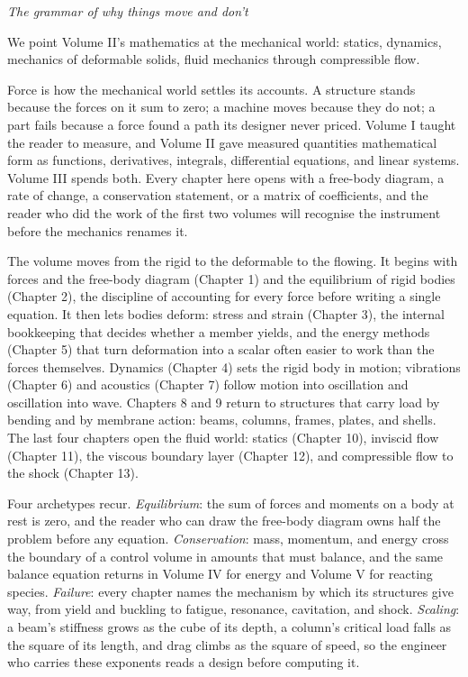 
\vspace*{1.5cm}
\begin{center}
\itshape\large
The grammar of why things move and don't
\end{center}
\vspace{0.5cm}

\noindent
We point Volume II's mathematics at the mechanical world: statics, dynamics, mechanics of deformable solids, fluid mechanics through compressible flow.

Force is how the mechanical world settles its accounts. A structure
stands because the forces on it sum to zero; a machine moves because
they do not; a part fails because a force found a path its designer
never priced. Volume I taught the reader to measure, and Volume II gave
measured quantities mathematical form as functions, derivatives,
integrals, differential equations, and linear systems. Volume III spends
both. Every chapter here opens with a free-body diagram, a rate of
change, a conservation statement, or a matrix of coefficients, and the
reader who did the work of the first two volumes will recognise the
instrument before the mechanics renames it.

The volume moves from the rigid to the deformable to the flowing. It
begins with forces and the free-body diagram (Chapter 1) and the
equilibrium of rigid bodies (Chapter 2), the discipline of accounting
for every force before writing a single equation. It then lets bodies
deform: stress and strain (Chapter 3), the internal bookkeeping that
decides whether a member yields, and the energy methods (Chapter 5) that
turn deformation into a scalar often easier to work than the forces
themselves. Dynamics (Chapter 4) sets the rigid body in motion;
vibrations (Chapter 6) and acoustics (Chapter 7) follow motion into
oscillation and oscillation into wave. Chapters 8 and 9 return to
structures that carry load by bending and by membrane action: beams,
columns, frames, plates, and shells. The last four chapters open the
fluid world: statics (Chapter 10), inviscid flow (Chapter 11), the
viscous boundary layer (Chapter 12), and compressible flow to the shock
(Chapter 13).

Four archetypes recur. \emph{Equilibrium}: the sum of forces and moments
on a body at rest is zero, and the reader who can draw the free-body
diagram owns half the problem before any equation. \emph{Conservation}:
mass, momentum, and energy cross the boundary of a control volume in
amounts that must balance, and the same balance equation returns in
Volume IV for energy and Volume V for reacting species.
\emph{Failure}: every chapter names the mechanism by which its
structures give way, from yield and buckling to fatigue, resonance,
cavitation, and shock. \emph{Scaling}: a beam's stiffness grows as the
cube of its depth, a column's critical load falls as the square of its
length, and drag climbs as the square of speed, so the engineer who
carries these exponents reads a design before computing it.

